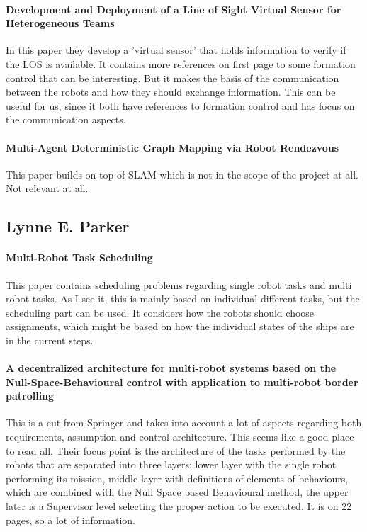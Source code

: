 \paragraph{Development and Deployment of a Line of Sight Virtual Sensor for Heterogeneous Teams }
In this paper they develop a 'virtual sensor' that holds information to verify if the LOS is available. It contains more references on first page to some formation control that can be interesting. But it makes the basis of the communication between the robots and how they should exchange information.
This can be useful for us, since it both have references to formation control and has focus on the communication aspects.

\paragraph{Multi-Agent Deterministic Graph Mapping via Robot Rendezvous }
This paper builds on top of SLAM which is not in the scope of the project at all.
Not relevant at all.


\subsection{Lynne E. Parker}

\paragraph{Multi-Robot Task Scheduling}
This paper contains scheduling problems regarding single robot tasks and multi robot tasks. As I see it, this is mainly based on individual different tasks, but the scheduling part can be used. It considers how the robots should choose assignments, which might be based on how the individual states of the ships are in the current steps.

\paragraph{A decentralized architecture for multi-robot systems based on the Null-Space-Behavioural control with application to multi-robot border patrolling}
This is a cut from Springer and takes into account a lot of aspects regarding both requirements, assumption and control architecture. This seems like a good place to read all. Their focus point is the architecture of the tasks performed by the robots that are separated into three layers; lower layer with the single robot performing its mission, middle layer with definitions of elements of behaviours, which are combined with the Null Space based Behavioural method, the upper later is a Supervisor level selecting the proper action to be executed. It is on 22 pages, so a lot of information.

